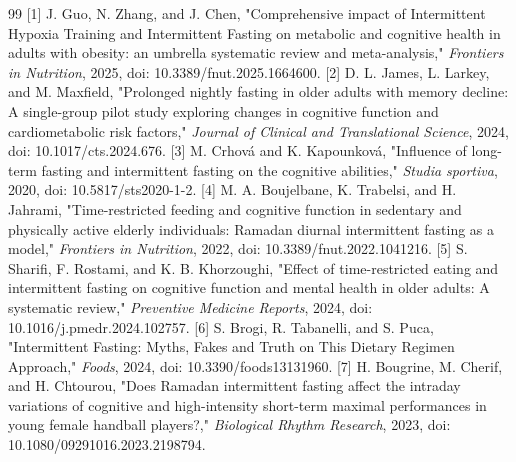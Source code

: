 \documentclass[conference]{IEEEtran}
\begin{document}
\begin{thebibliography}{99}
 [1] J. Guo, N. Zhang, and J. Chen, "Comprehensive impact of Intermittent Hypoxia Training and Intermittent Fasting on metabolic and cognitive health in adults with obesity: an umbrella systematic review and meta-analysis," \textit{Frontiers in Nutrition}, 2025, doi: 10.3389/fnut.2025.1664600.
 [2] D. L. James, L. Larkey, and M. Maxfield, "Prolonged nightly fasting in older adults with memory decline: A single-group pilot study exploring changes in cognitive function and cardiometabolic risk factors," \textit{Journal of Clinical and Translational Science}, 2024, doi: 10.1017/cts.2024.676.
 [3] M. Crhová and K. Kapounková, "Influence of long-term fasting and intermittent fasting on the cognitive abilities," \textit{Studia sportiva}, 2020, doi: 10.5817/sts2020-1-2.
 [4] M. A. Boujelbane, K. Trabelsi, and H. Jahrami, "Time-restricted feeding and cognitive function in sedentary and physically active elderly individuals: Ramadan diurnal intermittent fasting as a model," \textit{Frontiers in Nutrition}, 2022, doi: 10.3389/fnut.2022.1041216.
 [5] S. Sharifi, F. Rostami, and K. B. Khorzoughi, "Effect of time-restricted eating and intermittent fasting on cognitive function and mental health in older adults: A systematic review," \textit{Preventive Medicine Reports}, 2024, doi: 10.1016/j.pmedr.2024.102757.
 [6] S. Brogi, R. Tabanelli, and S. Puca, "Intermittent Fasting: Myths, Fakes and Truth on This Dietary Regimen Approach," \textit{Foods}, 2024, doi: 10.3390/foods13131960.
 [7] H. Bougrine, M. Cherif, and H. Chtourou, "Does Ramadan intermittent fasting affect the intraday variations of cognitive and high-intensity short-term maximal performances in young female handball players?," \textit{Biological Rhythm Research}, 2023, doi: 10.1080/09291016.2023.2198794.
\end{thebibliography}
\end{document}
